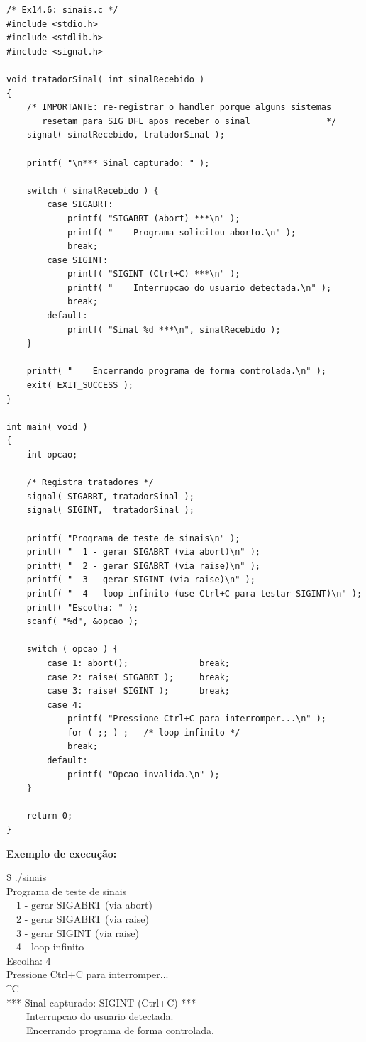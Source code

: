 \documentclass[12pt,a4paper]{article}
\begin{document}
\begin{respostabox}
\begin{lstlisting}
/* Ex14.6: sinais.c */
#include <stdio.h>
#include <stdlib.h>
#include <signal.h>

void tratadorSinal( int sinalRecebido )
{
    /* IMPORTANTE: re-registrar o handler porque alguns sistemas
       resetam para SIG_DFL apos receber o sinal               */
    signal( sinalRecebido, tratadorSinal );

    printf( "\n*** Sinal capturado: " );

    switch ( sinalRecebido ) {
        case SIGABRT:
            printf( "SIGABRT (abort) ***\n" );
            printf( "    Programa solicitou aborto.\n" );
            break;
        case SIGINT:
            printf( "SIGINT (Ctrl+C) ***\n" );
            printf( "    Interrupcao do usuario detectada.\n" );
            break;
        default:
            printf( "Sinal %d ***\n", sinalRecebido );
    }

    printf( "    Encerrando programa de forma controlada.\n" );
    exit( EXIT_SUCCESS );
}

int main( void )
{
    int opcao;

    /* Registra tratadores */
    signal( SIGABRT, tratadorSinal );
    signal( SIGINT,  tratadorSinal );

    printf( "Programa de teste de sinais\n" );
    printf( "  1 - gerar SIGABRT (via abort)\n" );
    printf( "  2 - gerar SIGABRT (via raise)\n" );
    printf( "  3 - gerar SIGINT (via raise)\n" );
    printf( "  4 - loop infinito (use Ctrl+C para testar SIGINT)\n" );
    printf( "Escolha: " );
    scanf( "%d", &opcao );

    switch ( opcao ) {
        case 1: abort();              break;
        case 2: raise( SIGABRT );     break;
        case 3: raise( SIGINT );      break;
        case 4:
            printf( "Pressione Ctrl+C para interromper...\n" );
            for ( ;; ) ;   /* loop infinito */
            break;
        default:
            printf( "Opcao invalida.\n" );
    }

    return 0;
}
\end{lstlisting}

\textbf{Exemplo de execução:}
\begin{saida}
\$ ./sinais\\
Programa de teste de sinais\\
\ \ 1 - gerar SIGABRT (via abort)\\
\ \ 2 - gerar SIGABRT (via raise)\\
\ \ 3 - gerar SIGINT (via raise)\\
\ \ 4 - loop infinito\\
Escolha: 4\\
Pressione Ctrl+C para interromper...\\
\^{}C\\
*** Sinal capturado: SIGINT (Ctrl+C) ***\\
\ \ \ \ Interrupcao do usuario detectada.\\
\ \ \ \ Encerrando programa de forma controlada.
\end{saida}
\end{respostabox}
\end{document}
